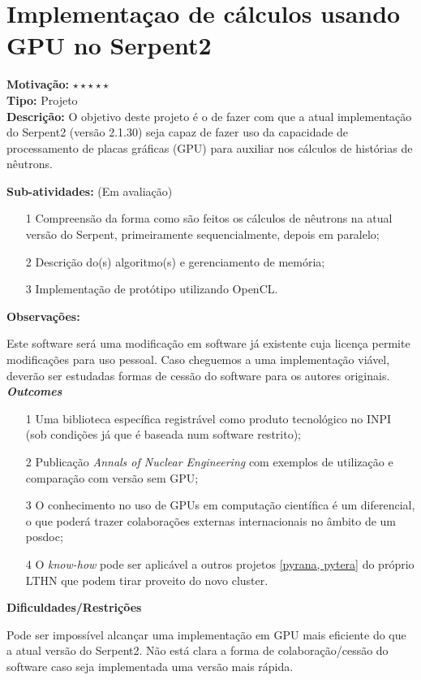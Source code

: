 \chapter{Implementaçao de cálculos usando GPU no Serpent2}

\textbf{Motivação:} $\star\star\star\star\star$\\

\textbf{Tipo:} Projeto\\

\textbf{Descrição:} O objetivo deste projeto é o de fazer com que a atual 
implementação do Serpent2 (versão 2.1.30) seja capaz de fazer uso da capacidade de 
processamento de placas gráficas (GPU) para auxiliar nos cálculos de histórias de 
nêutrons.

\textbf{Sub-atividades:} (Em avaliação) \\

\begin{itemize}
	\item[1] Compreensão da forma como são feitos os cálculos de nêutrons na atual 
	versão do Serpent, primeiramente sequencialmente, depois em paralelo;
	\item[2] Descrição do(s) algoritmo(s) e gerenciamento de memória;
	\item[3] Implementação de protótipo utilizando OpenCL.
\end{itemize}

\textbf{Observações:}

Este software será uma modificação em software já existente cuja licença permite 
modificações para uso pessoal. Caso cheguemos a uma implementação viável, deverão 
ser estudadas formas de cessão do software para os autores originais.\\

\textbf{\textit{Outcomes}}

\begin{itemize}
	\item[1] Uma biblioteca específica registrável como produto tecnológico no 
INPI (sob condições já que é baseada num software restrito);
	\item[2] Publicação \textit{Annals of Nuclear Engineering} com exemplos de 
	utilização e comparação com versão sem GPU;
	\item[3] O conhecimento no uso de GPUs em computação científica é um diferencial, o que poderá trazer colaborações externas internacionais no âmbito de um posdoc;
	\item[4] O \textit{know-how} pode ser aplicável a outros projetos \ref{pyrana, pytera} do próprio LTHN que podem tirar proveito do novo cluster.
\end{itemize}

\textbf{Dificuldades/Restrições}

Pode ser impossível alcançar uma implementação em GPU mais eficiente do que 
a atual versão do Serpent2. Não está clara a forma de colaboração/cessão do software caso seja implementada uma versão mais rápida.\\
